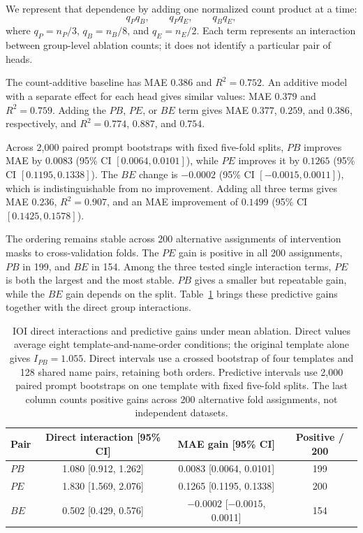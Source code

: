 \documentclass[sigconf,10pt,nonacm,balance=false]{acmart}
\begin{document}
We represent that dependence by adding one normalized count product at a time:
\[
q_Pq_B,\qquad q_Pq_E,\qquad q_Bq_E,
\]
where $q_P=n_P/3$, $q_B=n_B/8$, and $q_E=n_E/2$. Each term represents an interaction between group-level ablation counts; it does not identify a particular pair of heads.

The count-additive baseline has MAE $0.386$ and $R^2=0.752$. An additive model with a separate effect for each head gives similar values: MAE $0.379$ and $R^2=0.759$. Adding the $PB$, $PE$, or $BE$ term gives MAE $0.377$, $0.259$, and $0.386$, respectively, and $R^2=0.774$, $0.887$, and $0.754$.

Across 2,000 paired prompt bootstraps with fixed five-fold splits, $PB$ improves MAE by $0.0083$ (95\% CI $[0.0064,0.0101]$), while $PE$ improves it by $0.1265$ (95\% CI $[0.1195,0.1338]$). The $BE$ change is $-0.0002$ (95\% CI $[-0.0015,0.0011]$), which is indistinguishable from no improvement. Adding all three terms gives MAE $0.236$, $R^2=0.907$, and an MAE improvement of $0.1499$ (95\% CI $[0.1425,0.1578]$).

The ordering remains stable across 200 alternative assignments of intervention masks to cross-validation folds. The $PE$ gain is positive in all 200 assignments, $PB$ in 199, and $BE$ in 154. Among the three tested single interaction terms, $PE$ is both the largest and the most stable. $PB$ gives a smaller but repeatable gain, while the $BE$ gain depends on the split. Table~\ref{tab:ioi-main} brings these predictive gains together with the direct group interactions.

\begin{table}[t]
\centering
\begin{tabular}{@{}lccc@{}}
\toprule
Pair & Direct interaction [95\% CI] & MAE gain [95\% CI] & Positive / 200 \\
\midrule
$PB$ & 1.080 [0.912, 1.262] & 0.0083 [0.0064, 0.0101] & 199 \\
$PE$ & 1.830 [1.569, 2.076] & 0.1265 [0.1195, 0.1338] & 200 \\
$BE$ & 0.502 [0.429, 0.576] & $-0.0002$ [$-0.0015$, 0.0011] & 154 \\
\bottomrule
\end{tabular}
\caption{IOI direct interactions and predictive gains under mean ablation. Direct values average eight template-and-name-order conditions; the original template alone gives $I_{PB}=1.055$. Direct intervals use a crossed bootstrap of four templates and 128 shared name pairs, retaining both orders. Predictive intervals use 2,000 paired prompt bootstraps on one template with fixed five-fold splits. The last column counts positive gains across 200 alternative fold assignments, not independent datasets.}
\label{tab:ioi-main}
\end{table}
\end{document}
